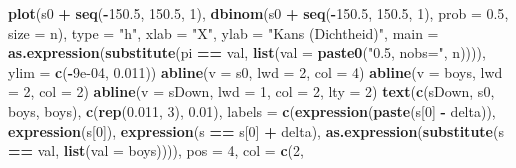 \documentclass[12pt,dutch,coursenotes]{book}
\newenvironment{Shaded}{\begin{snugshade}}{\end{snugshade}}
\newcommand{\KeywordTok}[1]{\textcolor[rgb]{0.13,0.29,0.53}{\textbf{#1}}}
\newcommand{\DataTypeTok}[1]{\textcolor[rgb]{0.13,0.29,0.53}{#1}}
\newcommand{\DecValTok}[1]{\textcolor[rgb]{0.00,0.00,0.81}{#1}}
\newcommand{\FloatTok}[1]{\textcolor[rgb]{0.00,0.00,0.81}{#1}}
\newcommand{\StringTok}[1]{\textcolor[rgb]{0.31,0.60,0.02}{#1}}
\newcommand{\OperatorTok}[1]{\textcolor[rgb]{0.81,0.36,0.00}{\textbf{#1}}}
\newcommand{\NormalTok}[1]{#1}
\theoremstyle{definition}
\theoremstyle{definition}
\theoremstyle{definition}
\theoremstyle{remark}
\begin{document}
\begin{Shaded}
\begin{Highlighting}[]
\KeywordTok{plot}\NormalTok{(s0 }\OperatorTok{+}\StringTok{ }\KeywordTok{seq}\NormalTok{(}\OperatorTok{-}\FloatTok{150.5}\NormalTok{, }\FloatTok{150.5}\NormalTok{, }\DecValTok{1}\NormalTok{), }\KeywordTok{dbinom}\NormalTok{(s0 }\OperatorTok{+}\StringTok{ }\KeywordTok{seq}\NormalTok{(}\OperatorTok{-}\FloatTok{150.5}\NormalTok{, }
    \FloatTok{150.5}\NormalTok{, }\DecValTok{1}\NormalTok{), }\DataTypeTok{prob =} \FloatTok{0.5}\NormalTok{, }\DataTypeTok{size =}\NormalTok{ n), }\DataTypeTok{type =} \StringTok{"h"}\NormalTok{, }\DataTypeTok{xlab =} \StringTok{"X"}\NormalTok{, }
    \DataTypeTok{ylab =} \StringTok{"Kans (Dichtheid)"}\NormalTok{, }\DataTypeTok{main =} \KeywordTok{as.expression}\NormalTok{(}\KeywordTok{substitute}\NormalTok{(pi }\OperatorTok{==}\StringTok{ }
\StringTok{        }\NormalTok{val, }\KeywordTok{list}\NormalTok{(}\DataTypeTok{val =} \KeywordTok{paste0}\NormalTok{(}\StringTok{"0.5, nobs="}\NormalTok{, n)))), }
    \DataTypeTok{ylim =} \KeywordTok{c}\NormalTok{(}\OperatorTok{-}\FloatTok{9e-04}\NormalTok{, }\FloatTok{0.011}\NormalTok{))}
\KeywordTok{abline}\NormalTok{(}\DataTypeTok{v =}\NormalTok{ s0, }\DataTypeTok{lwd =} \DecValTok{2}\NormalTok{, }\DataTypeTok{col =} \DecValTok{4}\NormalTok{)}
\KeywordTok{abline}\NormalTok{(}\DataTypeTok{v =}\NormalTok{ boys, }\DataTypeTok{lwd =} \DecValTok{2}\NormalTok{, }\DataTypeTok{col =} \DecValTok{2}\NormalTok{)}
\KeywordTok{abline}\NormalTok{(}\DataTypeTok{v =}\NormalTok{ sDown, }\DataTypeTok{lwd =} \DecValTok{1}\NormalTok{, }\DataTypeTok{col =} \DecValTok{2}\NormalTok{, }\DataTypeTok{lty =} \DecValTok{2}\NormalTok{)}
\KeywordTok{text}\NormalTok{(}\KeywordTok{c}\NormalTok{(sDown, s0, boys, boys), }\KeywordTok{c}\NormalTok{(}\KeywordTok{rep}\NormalTok{(}\FloatTok{0.011}\NormalTok{, }\DecValTok{3}\NormalTok{), }\FloatTok{0.01}\NormalTok{), }
    \DataTypeTok{labels =} \KeywordTok{c}\NormalTok{(}\KeywordTok{expression}\NormalTok{(}\KeywordTok{paste}\NormalTok{(s[}\DecValTok{0}\NormalTok{] }\OperatorTok{-}\StringTok{ }\NormalTok{delta)), }\KeywordTok{expression}\NormalTok{(s[}\DecValTok{0}\NormalTok{]), }
        \KeywordTok{expression}\NormalTok{(s }\OperatorTok{==}\StringTok{ }\NormalTok{s[}\DecValTok{0}\NormalTok{] }\OperatorTok{+}\StringTok{ }\NormalTok{delta), }\KeywordTok{as.expression}\NormalTok{(}\KeywordTok{substitute}\NormalTok{(s }\OperatorTok{==}\StringTok{ }
\StringTok{            }\NormalTok{val, }\KeywordTok{list}\NormalTok{(}\DataTypeTok{val =}\NormalTok{ boys)))), }\DataTypeTok{pos =} \DecValTok{4}\NormalTok{, }\DataTypeTok{col =} \KeywordTok{c}\NormalTok{(}\DecValTok{2}\NormalTok{, }

\end{Highlighting}
\end{Shaded}
\end{document}
